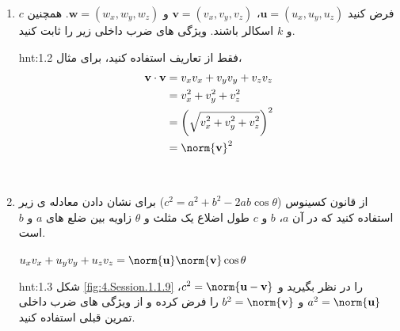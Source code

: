 {\begin{spacing}{1.5}
\begin{enumerate}[label=\textbf{\arabic*}.]
            \item {فرض کنید $\textbf{u}=(u_{x},u_{y},u_{z})$، $\textbf{v}=(v_{x},v_{y},v_{z})$ و $\textbf{w}=(w_{x},w_{y},w_{z})$. همچنین $c$ و $k$ اسکالر باشند. ویژگی های ضرب داخلی زیر را ثابت کنید.}
            \begin{flushleft}
            \end{flushleft}
            \begin{hint}{hnt:1.2}
                \Large
                فقط از تعاریف استفاده کنید، برای مثال،
                \begin{equation*}
                    \centering
                    \begin{split}
                        \textbf{v}\cdot\textbf{v}&=v_{x}v_{x}+v_{y}v_{y}+v_{z}v_{z} \\
                        &=v_{x}^2+v_{y}^2+v_{z}^2 \\
                        &=\left( \sqrt{\displaystyle v_{x}^2+v_{y}^2+v_{z}^2} \right)^2 \\
                        &=\norm{\textbf{v}}^2
                    \end{split}
                \end{equation*}
            \end{hint}
            \\
            \item \label{question.1.10} {از قانون کسینوس ($c^2=a^2+b^2-2ab\cos\theta$) برای نشان دادن معادله ی زیر استفاده کنید که در آن $a$، $b$ و $c$ طول اضلاع یک مثلث و $\theta$ زاویه بین ضلع های $a$ و $b$ است.}
            \begin{center}
                $u_{x}v_{x}+u_{y}v_{y}+u_{z}v_{z}=\norm{\textbf{u}}\norm{\textbf{v}}\cos\theta$
            \end{center}
            \begin{hint}{hnt:1.3}
                \Large
                شکل \ref{fig:4.Session.1.1.9} را در نظر بگیرید و $c^2=\norm{\textbf{u}-\textbf{v}}$، $a^2=\norm{\textbf{u}}$ و $b^2=\norm{\textbf{v}}$ را فرض کرده و از ویژگی های ضرب داخلی تمرین قبلی استفاده کنید.

\end{hint}
\end{enumerate}
\end{spacing}}

